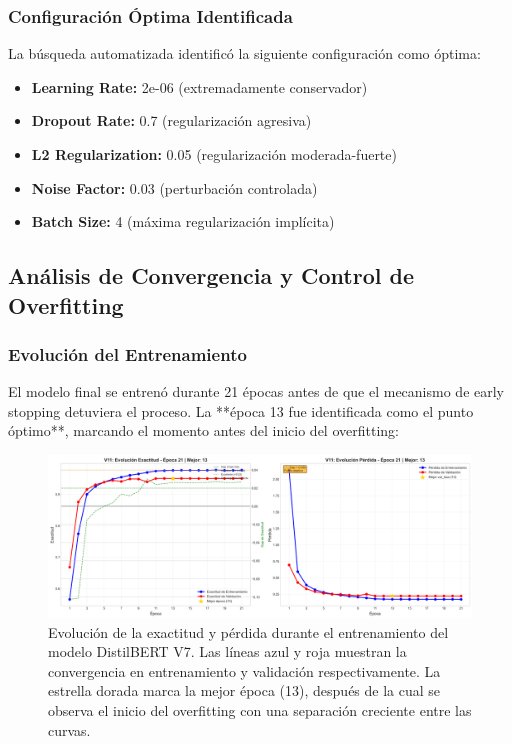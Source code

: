 \subsubsection{Configuración Óptima Identificada}

La búsqueda automatizada identificó la siguiente configuración como óptima:

\begin{itemize}
    \item \textbf{Learning Rate:} 2e-06 (extremadamente conservador)
    \item \textbf{Dropout Rate:} 0.7 (regularización agresiva)
    \item \textbf{L2 Regularization:} 0.05 (regularización moderada-fuerte)
    \item \textbf{Noise Factor:} 0.03 (perturbación controlada)
    \item \textbf{Batch Size:} 4 (máxima regularización implícita)
\end{itemize}

\subsection{Análisis de Convergencia y Control de Overfitting}
\label{subsec:convergencia_distilbert}

\subsubsection{Evolución del Entrenamiento}

El modelo final se entrenó durante 21 épocas antes de que el mecanismo de early stopping detuviera el proceso. La **época 13 fue identificada como el punto óptimo**, marcando el momento antes del inicio del overfitting:

\begin{figure}[h!]
    \centering
    \includegraphics[width=\textwidth]{Imagenes/Entrenamiento/curva_aprendizaje_v7.png}
    \caption{Evolución de la exactitud y pérdida durante el entrenamiento del modelo DistilBERT V7. Las líneas azul y roja muestran la convergencia en entrenamiento y validación respectivamente. La estrella dorada marca la mejor época (13), después de la cual se observa el inicio del overfitting con una separación creciente entre las curvas.}
    \label{fig:convergencia_distilbert}
\end{figure}

